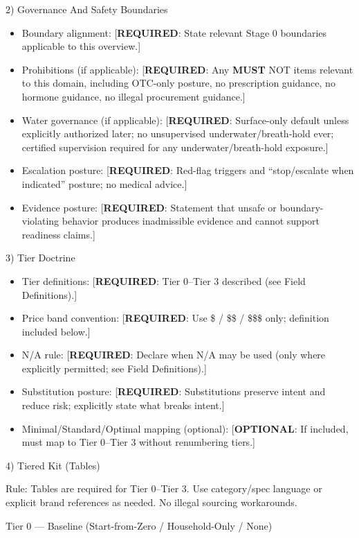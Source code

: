 \documentclass[10pt]{article}
\begin{document}
2) Governance And Safety Boundaries

\begin{itemize}
\item Boundary alignment: [\textbf{REQUIRED}: State relevant Stage 0 boundaries applicable to this overview.]
\item Prohibitions (if applicable): [\textbf{REQUIRED}: Any \textbf{MUST} NOT items relevant to this domain, including OTC-only posture, no prescription guidance, no hormone guidance, no illegal procurement guidance.]
\item Water governance (if applicable): [\textbf{REQUIRED}: Surface-only default unless explicitly authorized later; no unsupervised underwater/breath-hold ever; certified supervision required for any underwater/breath-hold exposure.]
\item Escalation posture: [\textbf{REQUIRED}: Red-flag triggers and “stop/escalate when indicated” posture; no medical advice.]
\item Evidence posture: [\textbf{REQUIRED}: Statement that unsafe or boundary-violating behavior produces inadmissible evidence and cannot support readiness claims.]
\end{itemize}

3) Tier Doctrine

\begin{itemize}
\item Tier definitions: [\textbf{REQUIRED}: Tier 0–Tier 3 described (see Field Definitions).]
\item Price band convention: [\textbf{REQUIRED}: Use \$ / \$\$ / \$\$\$ only; definition included below.]
\item N/A rule: [\textbf{REQUIRED}: Declare when N/A may be used (only where explicitly permitted; see Field Definitions).]
\item Substitution posture: [\textbf{REQUIRED}: Substitutions preserve intent and reduce risk; explicitly state what breaks intent.]
\item Minimal/Standard/Optimal mapping (optional): [\textbf{OPTIONAL}: If included, must map to Tier 0–Tier 3 without renumbering tiers.]
\end{itemize}

4) Tiered Kit (Tables)

Rule: Tables are required for Tier 0–Tier 3. Use category/spec language or explicit brand references as needed. No illegal sourcing workarounds.

Tier 0 — Baseline (Start-from-Zero / Household-Only / None)
\end{document}
